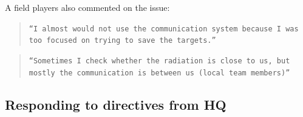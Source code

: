 A field players also commented on the issue:\\

\begin{quote}
\texttt{``I almost would not use the communication system because I was too focused on trying to save the targets.''}
\end{quote}

\begin{quote}
\texttt{``Sometimes I check whether the radiation is close to us, but mostly the communication is between us (local team members)''}
\end{quote}


\subsection{Responding to directives from HQ}

